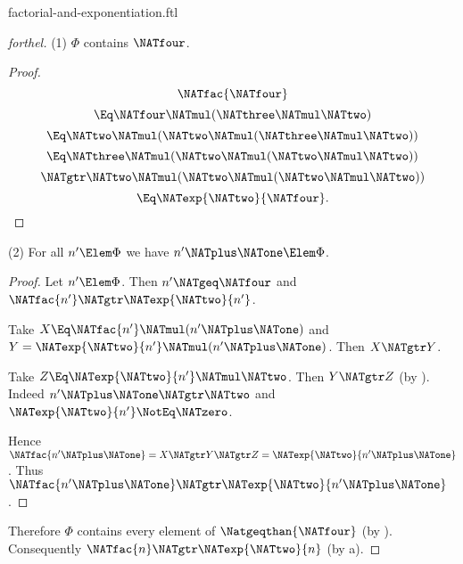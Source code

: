 \documentclass{stex}
\begin{document}
\begin{smodule}{factorial-and-exponentiation.ftl}
\begin{proof}[forthel]
  (1) $\Phi$ contains $\NATfour$.
  \begin{proof}
    \[  \NATfac{\NATfour}                                  \]
    \[    \Eq \NATfour \NATmul (\NATthree \NATmul \NATtwo)             \]
    \[    \Eq \NATtwo \NATmul (\NATtwo \NATmul (\NATthree \NATmul \NATtwo))   \]
    \[    \Eq \NATthree \NATmul (\NATtwo \NATmul (\NATtwo \NATmul \NATtwo))   \]
    \[    \NATgtr \NATtwo \NATmul (\NATtwo \NATmul (\NATtwo \NATmul \NATtwo))   \]
    \[    \Eq \NATexp{\NATtwo}{\NATfour}.                          \]
  \end{proof}

  (2) For all $n' \Elem \Phi$ we have $n' \NATplus \NATone \Elem \Phi$.
  \begin{proof}
    Let $n' \Elem \Phi$.
    Then $n' \NATgeq \NATfour$ and $\NATfac{n'} \NATgtr \NATexp{\NATtwo}{n'}$.

    Take $X \Eq \NATfac{n'} \NATmul (n' \NATplus \NATone)$ and $Y = \NATexp{\NATtwo}{n'} \NATmul (n' \NATplus \NATone)$.
    Then $X \NATgtr Y$.

    Take $Z \Eq \NATexp{\NATtwo}{n'} \NATmul \NATtwo$.
    Then $Y \NATgtr Z$ (by ).
    Indeed $n' \NATplus \NATone \NATgtr \NATtwo$ and $\NATexp{\NATtwo}{n'} \NotEq \NATzero$.

    Hence $\NATfac{n' \NATplus \NATone} = X \NATgtr Y \NATgtr Z = \NATexp{\NATtwo}{n' \NATplus \NATone}$.
    Thus $\NATfac{n' \NATplus \NATone} \NATgtr \NATexp{\NATtwo}{n' \NATplus \NATone}$.
  \end{proof}

  Therefore $\Phi$ contains every element of $\Natgeqthan{\NATfour}$ (by ).
  Consequently $\NATfac{n} \NATgtr \NATexp{\NATtwo}{n}$ (by a).
\end{proof}
\end{smodule}
\end{document}
